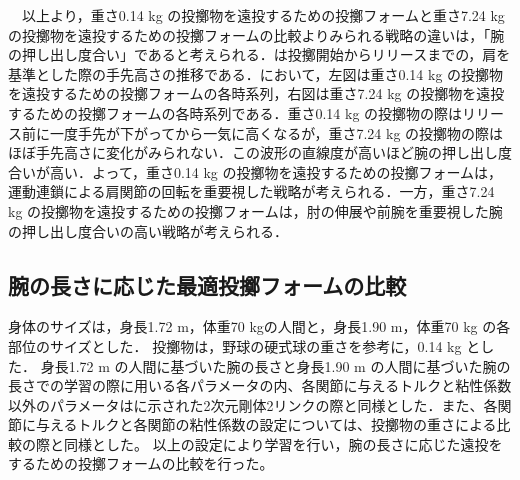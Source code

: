 \begin{small}
　以上より，重さ0.14 kg の投擲物を遠投するための投擲フォームと重さ7.24 kg の投擲物を遠投するための投擲フォームの比較よりみられる戦略の違いは，「腕の押し出し度合い」であると考えられる．は投擲開始からリリースまでの，肩を基準とした際の手先高さの推移である．において，左図は重さ0.14 kg の投擲物を遠投するための投擲フォームの各時系列，右図は重さ7.24 kg の投擲物を遠投するための投擲フォームの各時系列である．重さ0.14 kg の投擲物の際はリリース前に一度手先が下がってから一気に高くなるが，重さ7.24 kg の投擲物の際はほぼ手先高さに変化がみられない．この波形の直線度が高いほど腕の押し出し度合いが高い．よって，重さ0.14 kg の投擲物を遠投するための投擲フォームは，運動連鎖による肩関節の回転を重要視した戦略が考えられる．一方，重さ7.24 kg の投擲物を遠投するための投擲フォームは，肘の伸展や前腕を重要視した腕の押し出し度合いの高い戦略が考えられる．
\subsection{腕の長さに応じた最適投擲フォームの比較}
身体のサイズは，身長1.72 m，体重70 kgの人間と，身長1.90 m，体重70 kg の各部位のサイズとした．
投擲物は，野球の硬式球の重さを参考に，0.14 kg とした．
身長1.72 m の人間に基づいた腕の長さと身長1.90 m の人間に基づいた腕の長さでの学習の際に用いる各パラメータの内、各関節に与えるトルクと粘性係数以外のパラメータはに示された2次元剛体2リンクの際と同様とした．また、各関節に与えるトルクと各関節の粘性係数の設定については、投擲物の重さによる比較の際と同様とした。
以上の設定により学習を行い，腕の長さに応じた遠投をするための投擲フォームの比較を行った。

\end{small}
